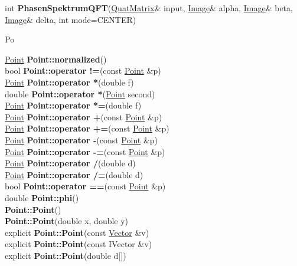 \documentclass[10pt,titlepage]{article}
\def\functionlistentry#1#2#3#4#5#6{\noindent #1 {\bf #2}(#3) \dotfill #6\\}
\def\letterref#1{}
\def\letterlabel#1{\vspace{0.5cm}\centerline{\Large #1}}
\def\letterlabelend#1{}
\begin{document}
{{\letterref{Pa}
\letterref{Pe}
\letterref{Ph}
\letterref{Po}
\letterref{Pr}
\letterref{Pu}
\letterlabelend{Ph}
\functionlistentry{int}{PhasenSpektrumQFT}{\hyperlink{QuatMatrix}{QuatMatrix}\& input, \hyperlink{Image}{Image}\& alpha, \hyperlink{Image}{Image}\& beta, \hyperlink{Image}{Image}\& delta, int mode=CENTER}{1544}{quaternions}{}

\letterlabel{Po}
\letterref{A}
\letterref{B}
\letterref{C}
\letterref{D}
\letterref{E}
\letterref{F}
\letterref{G}
\letterref{H}
\letterref{I}
\letterref{K}
\letterref{L}
\letterref{M}
\letterref{N}
\letterref{O}
\letterref{P}
\letterref{Q}
\letterref{R}
\letterref{S}
\letterref{T}
\letterref{U}
\letterref{V}
\letterref{W}
\letterref{X}
\letterref{Y}
\letterref{Z}

\letterref{Pa}
\letterref{Pe}
\letterref{Ph}
\letterref{Po}
\letterref{Pr}
\letterref{Pu}
\letterlabelend{Po}
\functionlistentry{\hyperlink{Point}{Point}}{Point::normalized}{}{173}{datastructures}{}
\functionlistentry{bool}{Point::operator !=}{const \hyperlink{Point}{Point} \&p}{160}{datastructures}{}
\functionlistentry{\hyperlink{Point}{Point}}{Point::operator *}{double f}{165}{datastructures}{}
\functionlistentry{double}{Point::operator *}{\hyperlink{Point}{Point} second}{167}{datastructures}{}
\functionlistentry{\hyperlink{Point}{Point}}{Point::operator *=}{double f}{166}{datastructures}{}
\functionlistentry{\hyperlink{Point}{Point}}{Point::operator +}{const \hyperlink{Point}{Point} \&p}{161}{datastructures}{}
\functionlistentry{\hyperlink{Point}{Point}}{Point::operator +=}{const \hyperlink{Point}{Point} \&p}{162}{datastructures}{}
\functionlistentry{\hyperlink{Point}{Point}}{Point::operator -}{const \hyperlink{Point}{Point} \&p}{163}{datastructures}{}
\functionlistentry{\hyperlink{Point}{Point}}{Point::operator -=}{const \hyperlink{Point}{Point} \&p}{164}{datastructures}{}
\functionlistentry{\hyperlink{Point}{Point}}{Point::operator /}{double d}{168}{datastructures}{}
\functionlistentry{\hyperlink{Point}{Point}}{Point::operator /=}{double d}{169}{datastructures}{}
\functionlistentry{bool}{Point::operator ==}{const \hyperlink{Point}{Point} \&p}{159}{datastructures}{}
\functionlistentry{double}{Point::phi}{}{172}{datastructures}{}
\functionlistentry{}{Point::Point}{}{152}{datastructures}{}
\functionlistentry{}{Point::Point}{double x, double y}{153}{datastructures}{}
\functionlistentry{explicit}{Point::Point}{const \hyperlink{Vector}{Vector} \&v}{154}{datastructures}{}
\functionlistentry{explicit}{Point::Point}{const IVector \&v}{155}{datastructures}{}
\functionlistentry{explicit}{Point::Point}{double d[]}{156}{datastructures}{}
}}
\end{document}
